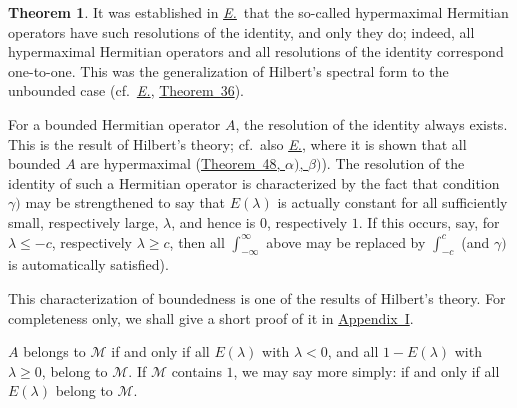 \documentclass[
  paper=b5,
  twoside=true,
  fontsize=13pt,
  headings=normal,
  bookmarkpackage=false
]{scrartcl}
\theoremstyle{definition}
\newtheorem{theorem}{Theorem}
\newcommand{\Eref}{\hyperref[fn:E-paper]{\emph{E.}}}
\newcommand{\ErefText}[1]{\href{https://doi.org/10.1007/BF01782338}{#1}}
\begin{document}
\begin{theorem}
{It was established in \Eref\ that the so-called hypermaximal Hermitian
operators have such resolutions of the identity, and only they do;
indeed, all hypermaximal Hermitian operators and all resolutions of the
identity correspond one-to-one.  This was the generalization of
Hilbert's spectral form to the unbounded case
(cf.\ \Eref, \ErefText{Theorem~36}).

For a bounded Hermitian operator \(A\), the resolution of the identity
always exists.  This is the result of Hilbert's theory; cf.\ also
\Eref, where it is shown that all bounded \(A\) are hypermaximal
(\ErefText{Theorem~48, \(\alpha)\), \(\beta)\)}). The resolution of the
identity of such a Hermitian operator is characterized by the fact that
condition \(\gamma)\) may be strengthened to say that \(E(\lambda)\) is
actually constant for all sufficiently small, respectively large,
\(\lambda\), and hence is \(0\), respectively \(1\).  If this occurs,
say, for \(\lambda\leq-c\), respectively \(\lambda\geq c\), then all
\(\int_{-\infty}^{\infty}\) above may be replaced by
\(\int_{-c}^{c}\) (and \(\gamma)\) is automatically satisfied).

This characterization of boundedness is one of the results of Hilbert's
theory.  For completeness only, we shall give a short proof of it in
\hyperref[app:bounded-spectral-families]{Appendix~I}.}
\(A\) belongs to \(\mathcal M\) if and only if all \(E(\lambda)\) with
\(\lambda<0\), and all \(1-E(\lambda)\) with \(\lambda\geq0\), belong
to \(\mathcal M\).  If \(\mathcal M\) contains \(1\), we may say more
simply: if and only if all \(E(\lambda)\) belong to \(\mathcal M\).
\end{theorem}
\endgroup
\end{document}

